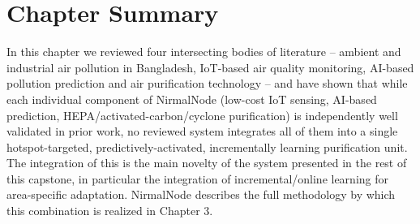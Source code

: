 \section{Chapter Summary}
\label{sec:lr-summary}

In this chapter we reviewed four intersecting bodies of literature – ambient and industrial air pollution in Bangladesh, IoT-based air quality monitoring, AI-based pollution prediction and air purification technology – and have shown that while each individual component of NirmalNode (low-cost IoT sensing, AI-based prediction, HEPA/activated-carbon/cyclone purification) is independently well validated in prior work, no reviewed system integrates all of them into a single hotspot-targeted, predictively-activated, incrementally learning purification unit. The integration of this is the main novelty of the system presented in the rest of this capstone, in particular the integration of incremental/online learning for area-specific adaptation. NirmalNode describes the full methodology by which this combination is realized in Chapter 3.